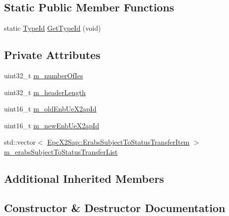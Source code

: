 \subsection*{Static Public Member Functions}
\begin{DoxyCompactItemize}
\item 
static \hyperlink{classns3_1_1TypeId}{Type\+Id} \hyperlink{classns3_1_1EpcX2SnStatusTransferHeader_a303b8346c4f77f95b3d42f9e461bf3b8}{Get\+Type\+Id} (void)
\end{DoxyCompactItemize}
\subsection*{Private Attributes}
\begin{DoxyCompactItemize}
\item 
uint32\+\_\+t \hyperlink{classns3_1_1EpcX2SnStatusTransferHeader_ae3327053016fdbdcefb2848d64a9f672}{m\+\_\+number\+Of\+Ies}
\item 
uint32\+\_\+t \hyperlink{classns3_1_1EpcX2SnStatusTransferHeader_ab68c11c68522b37d98cbd294d5b0dfd9}{m\+\_\+header\+Length}
\item 
uint16\+\_\+t \hyperlink{classns3_1_1EpcX2SnStatusTransferHeader_a90611f272b846cf8617cb050bf2d88db}{m\+\_\+old\+Enb\+Ue\+X2ap\+Id}
\item 
uint16\+\_\+t \hyperlink{classns3_1_1EpcX2SnStatusTransferHeader_ad9a1eee78ad41a6f2659d158e75f0d53}{m\+\_\+new\+Enb\+Ue\+X2ap\+Id}
\item 
std\+::vector$<$ \hyperlink{structns3_1_1EpcX2Sap_1_1ErabsSubjectToStatusTransferItem}{Epc\+X2\+Sap\+::\+Erabs\+Subject\+To\+Status\+Transfer\+Item} $>$ \hyperlink{classns3_1_1EpcX2SnStatusTransferHeader_aacd21028528eae5bdea4d2c3fa3974d4}{m\+\_\+erabs\+Subject\+To\+Status\+Transfer\+List}
\end{DoxyCompactItemize}
\subsection*{Additional Inherited Members}


\subsection{Constructor \& Destructor Documentation}
